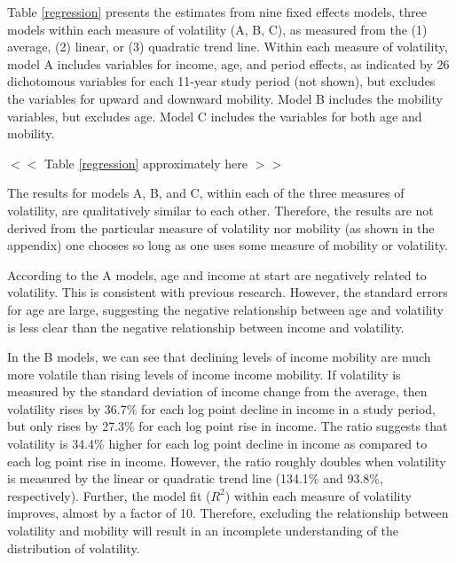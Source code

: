 \documentclass[12pt]{article}
\begin{document}
Table \ref{regression} presents the estimates from nine fixed effects models, three models within each measure of volatility (A, B, C), as measured from the (1) average, (2) linear, or (3) quadratic trend line.  Within each measure of volatility, model A includes variables for income, age, and period effects, as indicated by 26 dichotomous variables for each 11-year study period (not shown), but excludes the variables for upward and downward mobility. Model B includes the mobility variables, but excludes age. Model C includes the variables for both age and mobility.
\begin{center}
$<<$ Table \ref{regression} approximately here $>>$ 
\end{center}
The results for models A, B, and C, within each of the three measures of volatility, are qualitatively similar to each other.  Therefore, the results are not derived from the particular measure of volatility nor mobility (as shown in the appendix) one chooses so long as one uses some measure of mobility or volatility.  

According to the A models, age and income at start are negatively related to volatility. This is consistent with previous research. However, the standard errors for age are large, suggesting the negative relationship between age and volatility is less clear than the negative relationship between income and volatility.  

In the B models, we can see that declining levels of income mobility are much more volatile than rising levels of income income mobility. If volatility is measured by the standard deviation of income change from the average, then volatility rises by 36.7\% for each log point decline in income in a study period, but only rises by 27.3\% for each log point rise in income. The ratio suggests that volatility is 34.4\% higher for each log point decline in income as compared to each log point rise in income. However, the ratio roughly doubles when volatility is measured by the linear or quadratic trend line (134.1\% and 93.8\%, respectively). Further, the model fit ($R^2$) within each measure of volatility improves, almost by a factor of 10. Therefore, excluding the relationship between volatility and mobility will result in an incomplete understanding of the distribution of volatility. 
\end{document}
